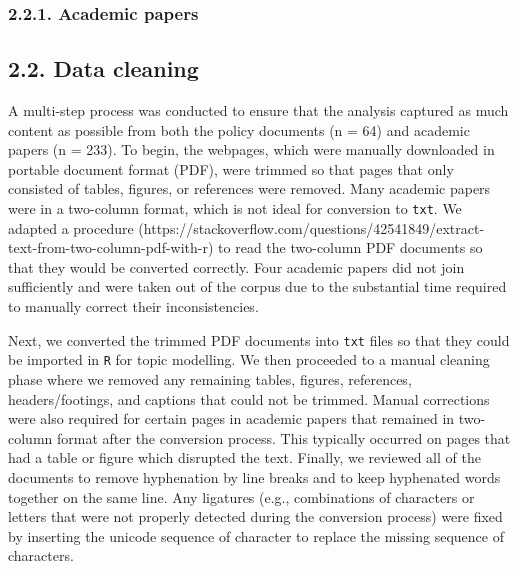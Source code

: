 \documentclass[]{elsarticle} %
\begin{document}
\begin{table}

\caption{\label{tab:policy-documents}\label{tab:search-results}Search results from the main STP stakeholder groups.}
\centering
{}
\end{table}

\hypertarget{academic-papers}{%
\subsubsection{2.2.1. Academic papers}\label{academic-papers}}

\hypertarget{data-cleaning}{%
\subsection{2.2. Data cleaning}\label{data-cleaning}}

A multi-step process was conducted to ensure that the analysis captured
as much content as possible from both the policy documents (n = 64) and
academic papers (n = 233). To begin, the webpages, which were manually
downloaded in portable document format (PDF), were trimmed so that pages
that only consisted of tables, figures, or references were removed. Many
academic papers were in a two-column format, which is not ideal for
conversion to \texttt{txt}. We adapted a procedure
(https://stackoverflow.com/questions/42541849/extract-text-from-two-column-pdf-with-r)
to read the two-column PDF documents so that they would be converted
correctly. Four academic papers did not join sufficiently and were taken
out of the corpus due to the substantial time required to manually
correct their inconsistencies.

Next, we converted the trimmed PDF documents into \texttt{txt} files so
that they could be imported in \texttt{R} for topic modelling. We then
proceeded to a manual cleaning phase where we removed any remaining
tables, figures, references, headers/footings, and captions that could
not be trimmed. Manual corrections were also required for certain pages
in academic papers that remained in two-column format after the
conversion process. This typically occurred on pages that had a table or
figure which disrupted the text. Finally, we reviewed all of the
documents to remove hyphenation by line breaks and to keep hyphenated
words together on the same line. Any ligatures (e.g., combinations of
characters or letters that were not properly detected during the
conversion process) were fixed by inserting the unicode sequence of
character to replace the missing sequence of characters.
\end{document}
